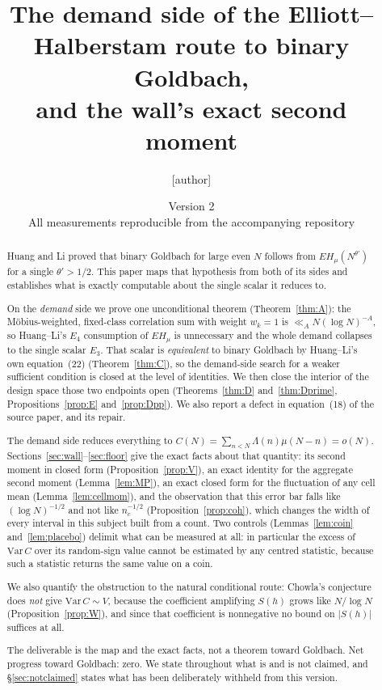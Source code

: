 \documentclass[11pt,a4paper]{article}
\title{The demand side of the Elliott--Halberstam route to binary
Goldbach,\\ and the wall's exact second moment}
\author{[author]}
\date{Version 2\\
\small All measurements reproducible from the accompanying repository}
\theoremstyle{plain}
\theoremstyle{definition}
\begin{document}
\maketitle

\begin{abstract}
Huang and Li proved that binary Goldbach for large even $N$ follows
from $EH_\mu(N^{\theta'})$ for a single $\theta' > 1/2$. This paper
maps that hypothesis from both of its sides and establishes what is
exactly computable about the single scalar it reduces to.

On the \emph{demand} side we prove one unconditional theorem
(Theorem~\ref{thm:A}): the M\"obius-weighted, fixed-class correlation
sum with weight $w_k = 1$ is $\ll_A N(\log N)^{-A}$, so Huang--Li's
$E_4$ consumption of $EH_\mu$ is unnecessary and the whole demand
collapses to the single scalar $E_3$. That scalar is \emph{equivalent}
to binary Goldbach by Huang--Li's own equation~(22)
(Theorem~\ref{thm:C}), so the demand-side search for a weaker
sufficient condition is closed at the level of identities. We then
close the interior of the design space those two endpoints open
(Theorems~\ref{thm:D} and~\ref{thm:Dprime},
Propositions~\ref{prop:E} and~\ref{prop:Dpp}). We also report a defect
in equation~(18) of the source paper, and its repair.

The demand side reduces everything to
$C(N)=\sum_{n<N}\Lambda(n)\mu(N-n) = o(N)$.
Sections~\ref{sec:wall}--\ref{sec:floor} give the exact facts about
that quantity: its second moment in closed form
(Proposition~\ref{prop:V}), an exact identity for the aggregate second
moment (Lemma~\ref{lem:MP}), an exact closed form for the fluctuation
of any cell mean (Lemma~\ref{lem:cellmom}), and the observation that
this error bar falls like $(\log N)^{-1/2}$ and not like $n_c^{-1/2}$
(Proposition~\ref{prop:coh}), which changes the width of every interval
in this subject built from a count. Two controls
(Lemmas~\ref{lem:coin} and~\ref{lem:placebo}) delimit what can be
measured at all: in particular the excess of $\mathrm{Var}\,C$ over its
random-sign value cannot be estimated by any centred statistic, because
such a statistic returns the same value on a coin.

We also quantify the obstruction to the natural conditional route:
Chowla's conjecture does \emph{not} give $\mathrm{Var}\,C \sim V$,
because the coefficient amplifying $S(h)$ grows like $N/\log N$
(Proposition~\ref{prop:W}), and since that coefficient is nonnegative
no bound on $|S(h)|$ suffices at all.

The deliverable is the map and the exact facts, not a theorem toward
Goldbach. Net progress toward Goldbach: zero. We state throughout what
is and is not claimed, and \S\ref{sec:notclaimed} states what has been
deliberately withheld from this version.
\end{abstract}
\end{document}
